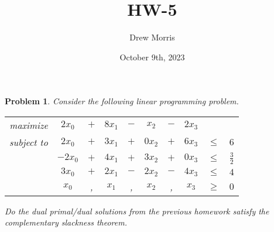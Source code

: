 \documentclass[12pt,oneside]{amsart}
\title{HW-5}
\author{Drew Morris}
\date{October 9th, 2023}
\numberwithin{equation}{section}
\numberwithin{figure}{section}
\theoremstyle{plain}
\newtheorem{prob}{Problem}
\theoremstyle{definition}
\begin{document}
\maketitle

\renewcommand*{\arraystretch}{1.5}

\begin{prob}
Consider the following linear programming problem. \\
\begin{center}\begin{tabular}{rccccccccc}
  maximize   & $2x_0$  & $+$ & $8x_1$ & $-$ & $x_2$  & $-$ & $2x_3$ &        &               \\
  subject to & $2x_0$  & $+$ & $3x_1$ & $+$ & $0x_2$ & $+$ & $6x_3$ & $\leq$ & $6$           \\
             & $-2x_0$ & $+$ & $4x_1$ & $+$ & $3x_2$ & $+$ & $0x_3$ & $\leq$ & $\frac{3}{2}$ \\
             & $3x_0$  & $+$ & $2x_1$ & $-$ & $2x_2$ & $-$ & $4x_3$ & $\leq$ & $4$           \\
             & $x_0$   & ,   & $x_1$  & ,   & $x_2$  & ,   & $x_3$  & $\geq$ & $0$           \\
\end{tabular}\end{center}
Do the dual primal/dual solutions from the previous homework satisfy the 
complementary slackness theorem. \\
\end{prob}
\end{document}
